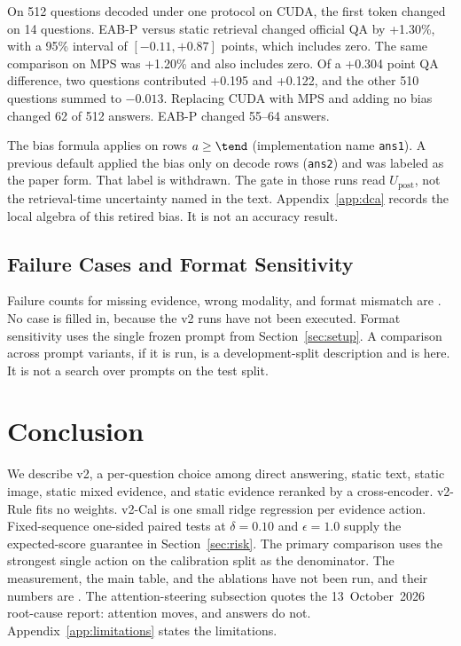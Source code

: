 On 512 questions decoded under one protocol on CUDA, the first token changed on 14 questions.
EAB-P versus static retrieval changed official QA by +1.30\%, with a 95\% interval of $[-0.11,+0.87]$ points, which includes zero.
The same comparison on MPS was +1.20\% and also includes zero.
Of a +0.304 point QA difference, two questions contributed +0.195 and +0.122, and the other 510 questions summed to $-0.013$.
Replacing CUDA with MPS and adding no bias changed 62 of 512 answers.
EAB-P changed 55--64 answers.

The bias formula applies on rows $a\ge\tend$ (implementation name \texttt{ans1}).
A previous default applied the bias only on decode rows (\texttt{ans2}) and was labeled as the paper form.
That label is withdrawn.
The gate in those runs read $U_{\mathrm{post}}$, not the retrieval-time uncertainty named in the text.
Appendix~\ref{app:dca} records the local algebra of this retired bias.
It is not an accuracy result.

\subsection{Failure Cases and Format Sensitivity}
\label{sec:cases}
Failure counts for missing evidence, wrong modality, and format mismatch are \ph{}.
No case is filled in, because the v2 runs have not been executed.
Format sensitivity uses the single frozen prompt from Section~\ref{sec:setup}.
A comparison across prompt variants, if it is run, is a development-split description and is \ph{} here.
It is not a search over prompts on the test split.

\section{Conclusion}
We describe \method{} v2, a per-question choice among direct answering, static text, static image, static mixed evidence, and static evidence reranked by a cross-encoder.
v2-Rule fits no weights.
v2-Cal is one small ridge regression per evidence action.
Fixed-sequence one-sided paired tests at $\delta=0.10$ and $\epsilon=1.0$ supply the expected-score guarantee in Section~\ref{sec:risk}.
The primary comparison uses the strongest single action on the calibration split as the denominator.
The measurement, the main table, and the ablations have not been run, and their numbers are \ph{}.
The attention-steering subsection quotes the 13~October~2026 root-cause report: attention moves, and answers do not.
Appendix~\ref{app:limitations} states the limitations.
